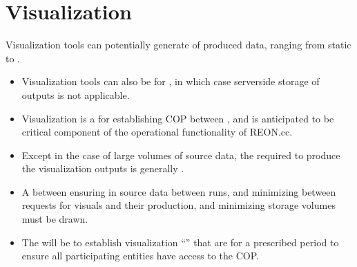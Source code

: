 \documentclass[letterpaper,10pt,english]{sphinxmanual}
\begin{document}
\section{Visualization}
\label{\detokenize{requirements/information/visualization:visualization}}\label{\detokenize{requirements/information/visualization::doc}}
\sphinxAtStartPar
Visualization tools can potentially generate  of produced data, ranging from static  to .
\begin{itemize}
\item {} 
\sphinxAtStartPar
Visualization tools can also be  for , in which case server\sphinxhyphen{}side storage of outputs is not applicable.

\item {} 
\sphinxAtStartPar
Visualization is a  for establishing COP between , and is anticipated to be critical component of the operational functionality of REON.cc.

\item {} 
\sphinxAtStartPar
Except in the case of large volumes of source data, the  required to produce the visualization outputs is generally .

\item {} 
\sphinxAtStartPar
A  between ensuring  in source data between runs, and minimizing  between requests for visuals and their production, and minimizing storage volumes must be drawn.

\item {} 
\sphinxAtStartPar
The  will be to establish visualization “” that are  for a prescribed period to ensure all participating entities have access to the COP.

\end{itemize}
\end{document}
